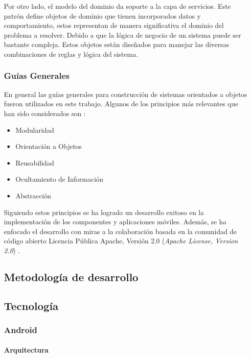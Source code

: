 Por otro lado, el modelo del dominio da soporte a la capa de servicios.
Este patrón define objetos de dominio que tienen incorporados datos
y comportamiento, estos representan de manera significativa el dominio
del problema a resolver. Debido a que la lógica de negocio de un sistema
puede ser bastante compleja. Estos objetos están diseñados para manejar
las diversas combinaciones de reglas y lógica del sistema.

\subsubsection{Guías Generales}

En general las guías generales para construcción de sistemas orientados
a objetos fueron utilizados en este trabajo. Algunos de los principios
más relevantes que han sido considerados son \cite{Albin2003}:
\begin{itemize}
\item Modularidad
\item Orientación a Objetos
\item Reusabilidad
\item Ocultamiento de Información
\item Abstracción
\end{itemize}
Siguiendo estos principios se ha logrado un desarrollo exitoso en
la implementación de los componentes y aplicaciones móviles. Además,
se ha enfocado el desarrollo con miras a la colaboración basada en
la comunidad de código abierto Licencia Pública Apache, Versión 2.0
(\emph{Apache License, Version 2.0}) \cite{GimenezYegros2016c}.

\subsection{Metodología de desarrollo}

\subsection{Tecnología }

\subsubsection{Android\texttrademark}

\paragraph{Arquitectura}

